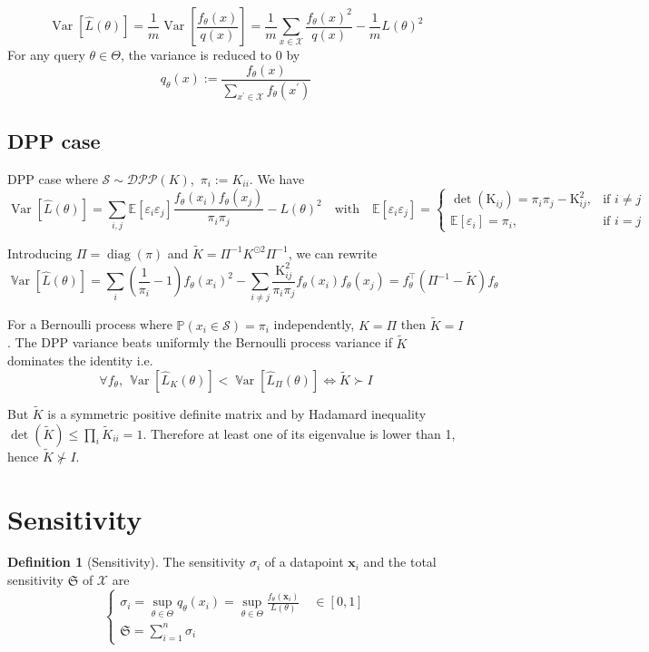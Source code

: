 \documentclass{article}
\renewcommand{\epsilon}{\varepsilon}
\newcommand{\Var}{\operatorname{\mathbb V ar}}
\theoremstyle{definition}
\newtheorem{definition}{Definition}[section]
\begin{document}
$$
	\operatorname{Var}[\hat L(\theta)] =\frac{1}{m} \operatorname{Var}\left[\frac {f_{\theta}(x)} {q(x)}\right] 
	=\frac{1}{m} \sum_{x \in \mathcal{X}} \frac{f_{\theta}(x)^{2}}{q(x)} -\frac{1}{m} L(\theta)^{2}
$$
For any query $\theta \in \Theta$, the variance is reduced to 0 by
$$
q_{\theta}(x):=\frac{ f_{\theta}(x)}{\sum_{x^{\prime} \in \mathcal{X}}  f_{\theta}\left(x^{\prime}\right)}
$$

\subsection{DPP case}
DPP case where $ \mathcal S \sim \mathcal{DPP}(K)$, \,$\pi_i := K_{ii}$. We have
$$
\operatorname{Var}[\hat L(\theta)]
=\sum_{i, j}\mathbb{E}\left[\epsilon_{i} \epsilon_{j}\right] \frac{f_\theta(x_{i}) f_\theta(x_{j})} {\pi_{i} \pi_{j}}  - L(\theta)^{2}
\quad \text{with} \quad
\mathbb{E}\left[\epsilon_{i} \epsilon_{j}\right]=
\begin{cases}
	\det\left(\mathrm{K}_{ij}\right)=\pi_{i} \pi_{j}-\mathrm{K}_{i j}^{2}, & \text{if } i \neq j \\
	\mathbb{E}\left[\epsilon_{i}\right]=\pi_{i}, & \text{if } i = j
\end{cases}
$$



Introducing $\Pi = \operatorname{diag}(\pi)$ and $\tilde K = \Pi^{-1}K^{\odot 2} \Pi^{-1}$, we can rewrite  
$$
\Var [\hat L(\theta)]=\sum_{i}\left(\frac{1}{\pi_{i}}-1\right) f_\theta(x_{i})^{2}-\sum_{i \neq j} \frac{\mathrm{K}_{i j}^{2}}{\pi_{i} \pi_{j}} f_\theta(x_{i}) f_\theta(x_{j}) =  f_\theta^\top (\Pi^{-1}  - \tilde{K}) f_\theta 
$$

	
For a Bernoulli process where $\mathbb P(x_i \in \mathcal S) = \pi_i$ independently, $K = \Pi$ then $\tilde K = I$. The DPP variance beats uniformly the Bernoulli process variance if $\tilde K$ dominates the identity i.e. 
$$ \forall f_\theta, \, \Var [\hat L_{K}(\theta)] < \Var [\hat L_{\Pi}(\theta)] \iff \tilde K \succ I$$

But $\tilde K$ is a symmetric positive definite matrix and by Hadamard inequality $\det( \tilde K) \leq \prod_{i} \tilde K_{ii}= 1$. Therefore at least one of its eigenvalue is lower than 1, hence $\tilde K \nsucc I$.
	
	

\section{Sensitivity}
\begin{definition}[Sensitivity]
	The sensitivity $\sigma_i$ of a datapoint $\boldsymbol{x}_{i}$ and the total sensitivity $\mathfrak S$ of $\mathcal X$ are
	$$
	\begin{cases}
		\sigma_{i}=\sup_{\theta \in \Theta} q_{\theta}(x_i) = \sup _{\theta \in \Theta} \frac{f_{\theta}\left(\boldsymbol{x}_{i}\right)}{L(\theta)} \quad \in[0,1]\\
		\mathfrak{S}=\sum_{i=1}^{n} \sigma_{i}
	\end{cases}
	$$
\end{definition} 
\end{document}
